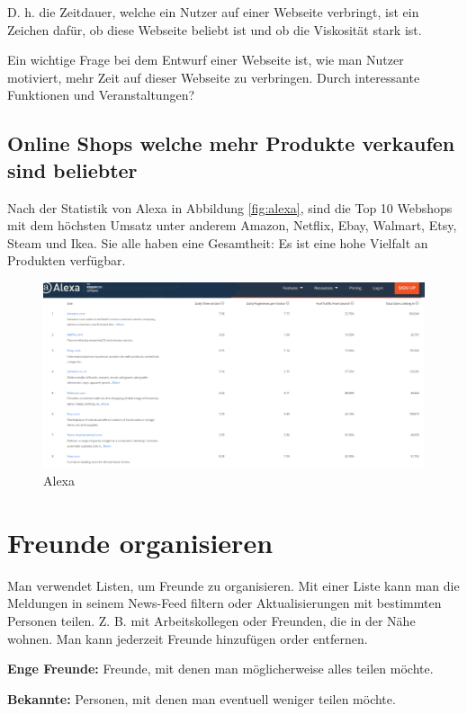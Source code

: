 D. h. die Zeitdauer, welche ein Nutzer auf einer Webseite verbringt, ist ein Zeichen dafür, ob diese Webseite beliebt ist und ob die Viskosität stark ist.

Ein wichtige Frage bei dem Entwurf einer Webseite ist, wie man Nutzer motiviert, mehr Zeit auf dieser Webseite zu verbringen. Durch interessante Funktionen und Veranstaltungen?


\subsection{Online Shops welche mehr Produkte verkaufen sind beliebter}

Nach der Statistik von Alexa in Abbildung \vref{fig:alexa}, sind die Top 10 Webshops mit dem höchsten Umsatz unter anderem Amazon, Netflix, Ebay, Walmart, Etsy, Steam und Ikea. Sie alle haben eine Gesamtheit: Es ist eine hohe Vielfalt an Produkten verfügbar.

\begin{figure}
	\centering
	\includegraphics[width=1\textwidth]{bilder/alexa.png}
	\caption{Alexa}
	\label{fig:alexa}
\end{figure}


\section{Freunde organisieren}

Man verwendet Listen, um  Freunde zu organisieren. Mit einer Liste kann man die Meldungen in seinem News-Feed filtern oder Aktualisierungen mit bestimmten Personen teilen. Z. B. mit Arbeitskollegen oder Freunden, die in der Nähe wohnen. Man kann jederzeit Freunde hinzufügen order entfernen. \parencite{facebook:help}

\textbf{Enge Freunde:} Freunde, mit denen man möglicherweise alles teilen möchte.

\textbf{Bekannte:} Personen, mit denen man eventuell weniger teilen möchte.


